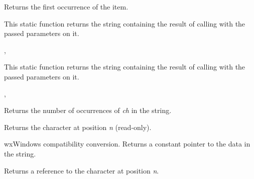 

Returns the first occurrence of the item.

\label{wxstringformat}


This static function returns the string containing the result of calling 
 with the passed parameters on it.


, 

\label{wxstringformatv}


This static function returns the string containing the result of calling 
 with the passed parameters on it.


, 

\label{wxstringfreq}


Returns the number of occurrences of {\it ch} in the string.

\label{wxstringgetchar}


Returns the character at position {\it n} (read-only).

\label{wxstringgetdata}


wxWindows compatibility conversion. Returns a constant pointer to the data in the string.

\label{wxstringgetwritablechar}


Returns a reference to the character at position {\it n}.

